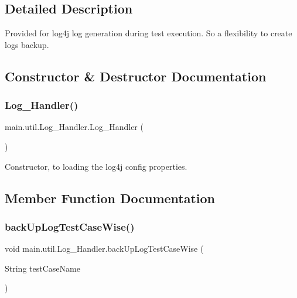 \subsection{Detailed Description}
Provided for log4j log generation during test execution. So a flexibility to create logs backup. 

\subsection{Constructor \& Destructor Documentation}
\mbox{\label{classmain_1_1util_1_1_log___handler_a3fc58be8e1937ce44367f9eeba0e390c}} 
\subsubsection{\texorpdfstring{Log\+\_\+\+Handler()}{Log\_Handler()}}
{\footnotesize\ttfamily main.\+util.\+Log\+\_\+\+Handler.\+Log\+\_\+\+Handler (\begin{DoxyParamCaption}{ }\end{DoxyParamCaption})}

Constructor, to loading the log4j config properties. 

\subsection{Member Function Documentation}
\mbox{\label{classmain_1_1util_1_1_log___handler_af77a2fd0473dc8b7417c6beda7dd1d58}} 
\subsubsection{\texorpdfstring{back\+Up\+Log\+Test\+Case\+Wise()}{backUpLogTestCaseWise()}}
{\footnotesize\ttfamily void main.\+util.\+Log\+\_\+\+Handler.\+back\+Up\+Log\+Test\+Case\+Wise (\begin{DoxyParamCaption}\item[{String}]{test\+Case\+Name }\end{DoxyParamCaption})}


